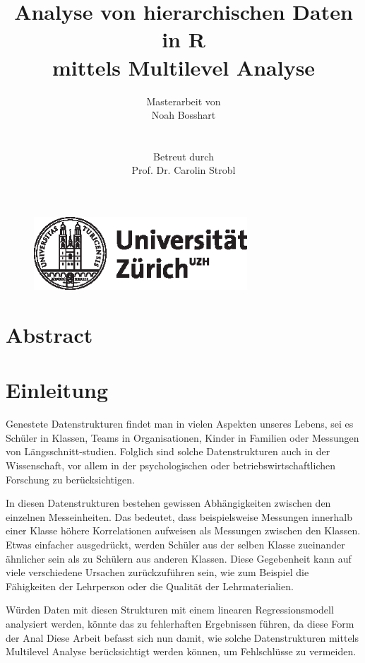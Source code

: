 \documentclass[12pt]{article}\usepackage[]{graphicx}\usepackage[]{color}
\title{Analyse von hierarchischen Daten in R \\ mittels Multilevel Analyse}
\author{Masterarbeit von \\ Noah Bosshart \\ \\ \\ Betreut durch \\ Prof. Dr. Carolin Strobl}
\begin{document}
\begin{figure}[t]
  \centering
  \includegraphics[width = 8cm]{uzh_logo}
\end{figure}

\maketitle

\newpage
\tableofcontents

\newpage
\section{Abstract}

\newpage

\section{Einleitung}


Genestete Datenstrukturen findet man in vielen Aspekten unseres Lebens, sei es Schüler in Klassen, Teams in Organisationen, Kinder in Familien oder Messungen von Längsschnitt-studien. Folglich sind solche Datenstrukturen auch in der Wissenschaft, vor allem in der psychologischen oder betriebswirtschaftlichen Forschung zu berücksichtigen.

In diesen Datenstrukturen bestehen gewissen Abhängigkeiten zwischen den einzelnen Messeinheiten. Das bedeutet, dass beispielsweise Messungen innerhalb einer Klasse höhere Korrelationen aufweisen als Messungen zwischen den Klassen. Etwas einfacher ausgedrückt, werden Schüler aus der selben Klasse zueinander ähnlicher sein als zu Schülern aus anderen Klassen. Diese Gegebenheit kann auf viele verschiedene Ursachen zurückzuführen sein, wie zum Beispiel die Fähigkeiten der Lehrperson oder die Qualität der Lehrmaterialien. 


Würden Daten mit diesen Strukturen mit einem linearen Regressionsmodell analysiert werden, könnte das zu fehlerhaften Ergebnissen führen, da diese Form der Anal Diese Arbeit befasst sich nun damit, wie solche Datenstrukturen  mittels Multilevel Analyse berücksichtigt werden können, um Fehlschlüsse zu vermeiden.
\end{document}

